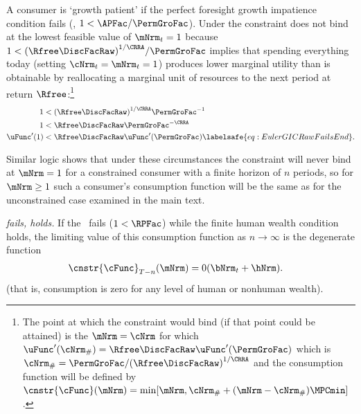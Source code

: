 \documentclass[\econtexRoot/BufferStockTheory]{subfiles}
\begin{document}
A consumer is `growth patient' if the perfect foresight growth
impatience condition fails (\cncl{\GICRaw}, $1 < \APFac/\PermGroFac$).
Under
\cncl{\GICRaw} the constraint does not bind at the lowest feasible value of $\mNrm_{t}=1$ because
$1 < {(\Rfree\DiscFacRaw)}^{1/\CRRA}/\PermGroFac$ implies that spending
everything today (setting $\cNrm_{t}=\mNrm_{t}=1$) produces lower
marginal utility than is obtainable by reallocating a marginal unit of
resources to the next period at return $\Rfree$:\footnote{The point at
  which the constraint would bind (if that point could be attained) is
  the $\mNrm=\cNrm$ for which $\uFunc^{\prime}(\cNrm_{\#}) = \Rfree
  \DiscFacRaw \uFunc^{\prime}(\PermGroFac)$ which is $\cNrm_{\#} =
  \PermGroFac/{(\Rfree \DiscFacRaw)}^{1/\CRRA}$ and the consumption function
  will be defined by
  $\cnstr{\cFunc}(\mNrm)=\min[\mNrm,\cNrm_{\#}+(\mNrm-\cNrm_{\#})\MPCmin
  ]$.}
\begin{equation}\begin{gathered}\begin{aligned}
  1  & < {(\Rfree \DiscFacRaw)}^{1/\CRRA}\PermGroFac^{-1}    \notag
  \\ 1  & < \Rfree \DiscFacRaw \PermGroFac^{-\CRRA} \notag
  \\  \uFunc^{\prime}(1)  & < \Rfree \DiscFacRaw \uFunc^{\prime}(\PermGroFac)   \labelsafe{eq:EulerGICRawFailsEnd}.
\end{aligned}\end{gathered}\end{equation}

Similar logic shows that under these circumstances the constraint will never bind at $\mNrm=1$ for a constrained consumer with a finite horizon of $n$ periods, so for $\mNrm \geq 1$ such a consumer's consumption function will be the same as for the unconstrained case examined in the main text.

\hypertarget{cnclGICRawcnclRICFHWC}{}

\textit{{\RIC} fails, {\FHWC} holds.} If the \RIC~fails ($1 < \RPFac$) while the finite human wealth condition
holds, the limiting value of this consumption function as $n \rightarrow
\infty$ is the degenerate function
\begin{equation}\begin{gathered}\begin{aligned}
  \cnstr{\cFunc}_{T-n}(\mNrm)  & = 0 (\bNrm_{t}+\hNrm).
\end{aligned}\end{gathered}\end{equation}
(that is, consumption is zero for any level of human or nonhuman wealth).
\end{document}
